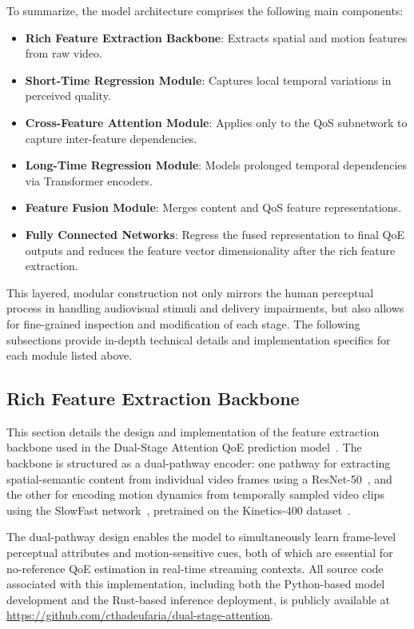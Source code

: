 To summarize, the model architecture comprises the following main components:
\begin{itemize}
\item \textbf{Rich Feature Extraction Backbone}: Extracts spatial and motion features from raw video.
\item \textbf{Short-Time Regression Module}: Captures local temporal variations in perceived quality.
\item \textbf{Cross-Feature Attention Module}: Applies only to the QoS subnetwork to capture inter-feature dependencies.
\item \textbf{Long-Time Regression Module}: Models prolonged temporal dependencies via Transformer encoders.
\item \textbf{Feature Fusion Module}: Merges content and QoS feature representations.
\item \textbf{Fully Connected Networks}: Regress the fused representation to final QoE outputs and reduces the feature vector dimensionality after the rich feature extraction.
\end{itemize}

This layered, modular construction not only mirrors the human perceptual process in handling audiovisual stimuli and delivery impairments, but also allows for fine-grained inspection and modification of each stage. The following subsections provide in-depth technical details and implementation specifics for each module listed above.

\subsection{Rich Feature Extraction Backbone}

This section details the design and implementation of the feature extraction backbone used in the Dual-Stage Attention QoE prediction model~\cite{jia2024continuous}. The backbone is structured as a dual-pathway encoder: one pathway for extracting spatial-semantic content from individual video frames using a ResNet-50~\cite{he2016deep}, and the other for encoding motion dynamics from temporally sampled video clips using the SlowFast network~\cite{feichtenhofer2019slowfast}, pretrained on the Kinetics-400 dataset~\cite{kay2017kineticshumanactionvideo}. 

The dual-pathway design enables the model to simultaneously learn frame-level perceptual attributes and motion-sensitive cues, both of which are essential for no-reference QoE estimation in real-time streaming contexts. All source code associated with this implementation, including both the Python-based model development and the Rust-based inference deployment, is publicly available at \url{https://github.com/cthadeufaria/dual-stage-attention}.

